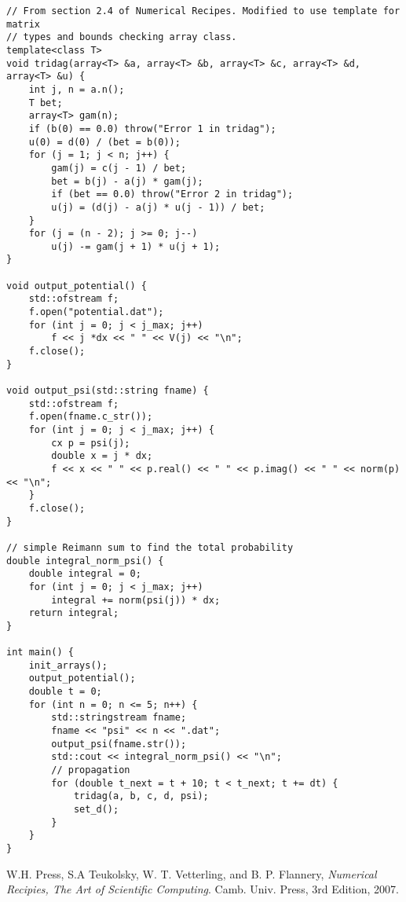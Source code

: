 \documentclass[12pt]{article}
\begin{document}
\begin{lstlisting}
// From section 2.4 of Numerical Recipes. Modified to use template for matrix
// types and bounds checking array class.
template<class T>
void tridag(array<T> &a, array<T> &b, array<T> &c, array<T> &d, array<T> &u) {
    int j, n = a.n();
    T bet;
    array<T> gam(n);
    if (b(0) == 0.0) throw("Error 1 in tridag");
    u(0) = d(0) / (bet = b(0));
    for (j = 1; j < n; j++) {
        gam(j) = c(j - 1) / bet;
        bet = b(j) - a(j) * gam(j);
        if (bet == 0.0) throw("Error 2 in tridag");
        u(j) = (d(j) - a(j) * u(j - 1)) / bet;
    }
    for (j = (n - 2); j >= 0; j--)
        u(j) -= gam(j + 1) * u(j + 1);
}

void output_potential() {
    std::ofstream f;
    f.open("potential.dat");
    for (int j = 0; j < j_max; j++)
        f << j *dx << " " << V(j) << "\n";
    f.close();
}

void output_psi(std::string fname) {
    std::ofstream f;
    f.open(fname.c_str());
    for (int j = 0; j < j_max; j++) {
        cx p = psi(j);
        double x = j * dx;
        f << x << " " << p.real() << " " << p.imag() << " " << norm(p) << "\n";
    }
    f.close();
}

// simple Reimann sum to find the total probability
double integral_norm_psi() {
    double integral = 0;
    for (int j = 0; j < j_max; j++)
        integral += norm(psi(j)) * dx;
    return integral;
}

int main() {
    init_arrays();
    output_potential();
    double t = 0;
    for (int n = 0; n <= 5; n++) {
        std::stringstream fname;
        fname << "psi" << n << ".dat";
        output_psi(fname.str());
        std::cout << integral_norm_psi() << "\n";
        // propagation
        for (double t_next = t + 10; t < t_next; t += dt) {
            tridag(a, b, c, d, psi);
            set_d();
        }
    }
}
\end{lstlisting}

\begin{thebibliography}{9}

  W.H. Press, S.A Teukolsky, W. T. Vetterling, and B. P. Flannery,
  \emph{Numerical Recipies, The Art of Scientific Computing}.
  Camb. Univ. Press,
  3rd Edition,
  2007.

\end{thebibliography}
\end{document}
